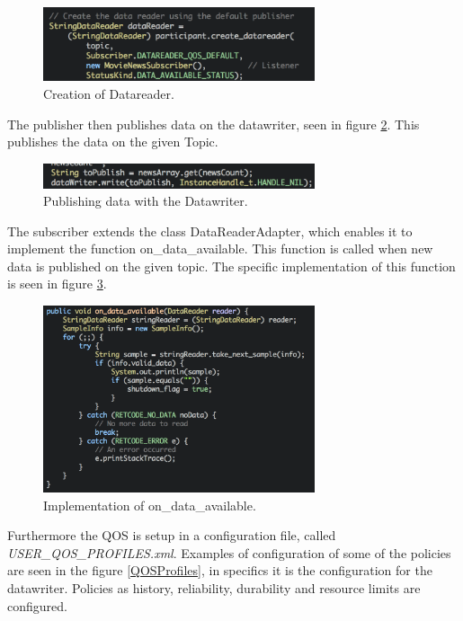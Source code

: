 \begin{figure}[ht!]
\centering
\includegraphics[width=80mm]{img/CreateDataReader.png}
\caption{Creation of Datareader.}
\label{CreateDataReader}
\end{figure}

The publisher then publishes data on the datawriter, seen in figure \ref{DataWriterWrite}. This publishes the data on the given Topic.

\begin{figure}[ht!]
\centering
\includegraphics[width=80mm]{img/DataWriterWrite.png}
\caption{Publishing data with the Datawriter.}
\label{DataWriterWrite}
\end{figure}

The subscriber extends the class DataReaderAdapter, which enables it to implement the function on\_data\_available. This function is called when new data is published on the given topic. The specific implementation of this function is seen in figure \ref{OnDataAvailable}.

\begin{figure}[ht!]
\centering
\includegraphics[width=80mm]{img/OnDataAvailable.png}
\caption{Implementation of on\_data\_available.}
\label{OnDataAvailable}
\end{figure}

Furthermore the QOS is setup in a configuration file, called \emph{USER\_QOS\_PROFILES.xml}. Examples of configuration of some of the policies are seen in the figure \ref{QOSProfiles}, in specifics it is the configuration for the datawriter. Policies as history, reliability, durability and resource limits are configured.

